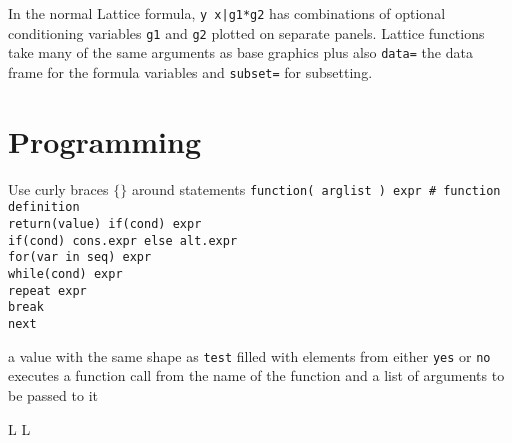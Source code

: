 In the normal Lattice formula, {\tt y~x|g1*g2} has
combinations of optional conditioning variables {\tt g1} and {\tt g2} plotted
on separate panels. Lattice functions take many of the same arguments as base
graphics plus also {\tt data=} the data frame for the formula variables and
{\tt subset=} for subsetting.

\section{Programming}{ Use curly braces $\lbrace\rbrace$ around statements }
{\tt function( arglist ) expr \# function definition\\ return(value) if(cond)
    expr\\ if(cond) cons.expr else  alt.expr\\ for(var in seq) expr\\
    while(cond) expr\\ repeat expr\\ break\\ next\\ }

	{a value with the same shape as {\tt test}
filled with elements from either {\tt yes} or {\tt no}}
	{executes a function call from the name of the
function and a list of arguments to be passed to it}

\copyrightnotice

\supereject
\if L\lr \else\null\vfill\eject\fi
\if L\lr \else\null\vfill\eject\fi
\bye

